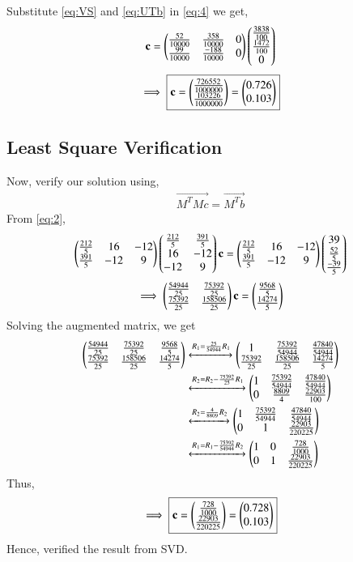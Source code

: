 \documentclass[journal,12pt,twocolumn]{IEEEtran}
\begin{document}
Substitute \eqref{eq:VS} and \eqref{eq:UTb} in \eqref{eq:4} we get,
\begin{align}
	 \mathbf{c} = \begin{pmatrix}\frac{52}{10000} & \frac{358}{10000} & 0 \\ \frac{99}{10000} & \frac{-188}{10000} & 0 \end{pmatrix}\begin{pmatrix}\frac{3838}{100}\\ \frac{1472}{100}\\ 0\end{pmatrix} 
\end{align}
\begin{align}
	\implies \boxed{\mathbf{c} = \begin{pmatrix}\frac{726552}{1000000}\\ \frac{103226}{1000000}\end{pmatrix} =\begin{pmatrix}0.726 \\ 0.103\end{pmatrix} }
\end{align} 
\subsection{Least Square Verification}
Now, verify our solution using,
\begin{align}
	 \vec{M^TMc} = \vec{M^Tb} 
\end{align}
From \eqref{eq:2},
\begin{align}
\begin{pmatrix}\frac{212}{5} & 16 & -12 \\ \frac{391}{5} & -12 & 9 \end{pmatrix} \begin{pmatrix}\frac{212}{5} & \frac{391}{5} \\ 16 & -12 \\ -12 & 9\end{pmatrix} \mathbf{c}= \begin{pmatrix}\frac{212}{5} & 16 & -12 \\ \frac{391}{5} & -12 & 9 \end{pmatrix} \begin{pmatrix}39 \\ \frac{52}{5}\\ \frac{-39}{5}\end{pmatrix}
\end{align}
\begin{align}
    \implies \begin{pmatrix}\frac{54944}{25} & \frac{75392}{25} \\ \frac{75392}{25} & \frac{158506}{25} \end{pmatrix} \mathbf{c}= \begin{pmatrix}\frac{9568}{5} \\ \frac{14274}{5} \end{pmatrix}
\end{align}
Solving the augmented matrix, we get
\begin{align}
\begin{pmatrix}\frac{54944}{25}&\frac{75392}{25}&\frac{9568}{5}\\\frac{75392}{25}&\frac{158506}{25}&\frac{14274}{5}\end{pmatrix} &\xleftrightarrow{R_1=\frac{25}{54944}R_1}\begin{pmatrix}1&\frac{75392}{54944}&\frac{47840}{54944}\\\frac{75392}{25}&\frac{158506}{25}&\frac{14274}{5}\end{pmatrix}\\
&\xleftrightarrow{R_2=R_2-\frac{75392}{25}R_1}\begin{pmatrix}1&\frac{75392}{54944}&\frac{47840}{54944}\\0&\frac{8809}{4}&\frac{22903}{100}\end{pmatrix}\\
&\xleftrightarrow{R_2=\frac{4}{8809}R_2}\begin{pmatrix}1&\frac{75392}{54944}&\frac{47840}{54944}\\0&1&\frac{22903}{220225}\end{pmatrix}\\
&\xleftrightarrow{R_1=R_1-\frac{75392}{54944}R_2}\begin{pmatrix}1&0&\frac{728}{1000}\\0&1&\frac{22903}{220225}\end{pmatrix}
\end{align}
Thus,
\begin{align}
    \implies \boxed{\mathbf{c}= \begin{pmatrix}\frac{728}{1000} \\ \frac{22903}{220225} \end{pmatrix}= \begin{pmatrix}0.728 \\ 0.103\end{pmatrix}}
\end{align}
Hence, verified the result from SVD.
\end{document}
